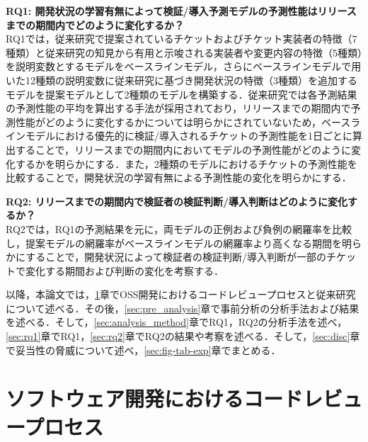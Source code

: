 \documentclass[11pt]{jreport}
\newcommand{\rqone}{開発状況の学習有無によって検証/導入予測モデルの予測性能はリリースまでの期間内でどのように変化するか？}
\newcommand{\rqtwo}{リリースまでの期間内で検証者の検証判断/導入判断はどのように変化するか？}
\begin{document}
\noindent\textbf{RQ1: \rqone}\\
RQ1では，従来研究\cite{prioritizer}で提案されているチケットおよびチケット実装者の特徴（7種類）と従来研究\cite{release_merge}\cite{review1}の知見から有用と示唆される実装者や変更内容の特徴（5種類）を説明変数とするモデルをベースラインモデル，さらにベースラインモデルで用いた12種類の説明変数に従来研究に基づき開発状況の特徴（3種類）を追加するモデルを提案モデルとして2種類のモデルを構築する．従来研究\cite{prioritizer}では各予測結果の予測性能の平均を算出する手法が採用されており，リリースまでの期間内で予測性能がどのように変化するかについては明らかにされていないため，ベースラインモデルにおける優先的に検証/導入されるチケットの予測性能を1日ごとに算出することで，リリースまでの期間内においてモデルの予測性能がどのように変化するかを明らかにする．また，2種類のモデルにおけるチケットの予測性能を比較することで，開発状況の学習有無による予測性能の変化を明らかにする．

\noindent\textbf{RQ2: \rqtwo}\\
RQ2では，RQ1の予測結果を元に，両モデルの正例および負例の網羅率を比較し，提案モデルの網羅率がベースラインモデルの網羅率より高くなる期間を明らかにすることで，開発状況によって検証者の検証判断/導入判断が一部のチケットで変化する期間および判断の変化を考察する．


以降，本論文では，\ref{sec:intro}章でOSS開発におけるコードレビュープロセスと従来研究について述べる．その後，\ref{sec:pre_analysis}章で事前分析の分析手法および結果を述べる．そして，\ref{sec:analysis_method}章でRQ1，RQ2の分析手法を述べ，\ref{sec:rq1}章でRQ1，\ref{sec:rq2}章でRQ2の結果や考察を述べる．そして，\ref{sec:disc}章で妥当性の脅威について述べ，\ref{sec:fig-tab-exp}章でまとめる．

\chapter{ソフトウェア開発におけるコードレビュープロセス}\label{sec:intro}
\end{document}
